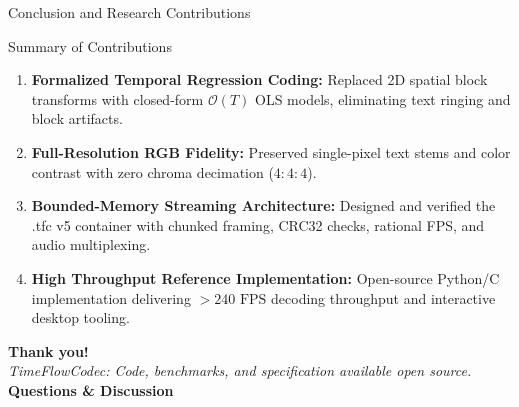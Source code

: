 \documentclass[aspectratio=169, 10pt]{beamer}
\begin{document}
\begin{frame}{Conclusion and Research Contributions}
    \begin{block}{Summary of Contributions}
        \begin{enumerate}
            \item \textbf{Formalized Temporal Regression Coding:} Replaced 2D spatial block transforms with closed-form $\mathcal{O}(T)$ OLS models, eliminating text ringing and block artifacts.
            \item \textbf{Full-Resolution RGB Fidelity:} Preserved single-pixel text stems and color contrast with zero chroma decimation ($4:4:4$).
            \item \textbf{Bounded-Memory Streaming Architecture:} Designed and verified the .tfc v5 container with chunked framing, CRC32 checks, rational FPS, and audio multiplexing.
            \item \textbf{High Throughput Reference Implementation:} Open-source Python/C implementation delivering $>240\text{ FPS}$ decoding throughput and interactive desktop tooling.
        \end{enumerate}
    \end{block}
    \vspace{2mm}
    \begin{center}
        \textbf{Thank you!} \\
        \vspace{1mm}
        \textit{TimeFlowCodec: Code, benchmarks, and specification available open source.} \\
        \vspace{2mm}
        \textbf{Questions \& Discussion}
    \end{center}
\end{frame}
\end{document}
